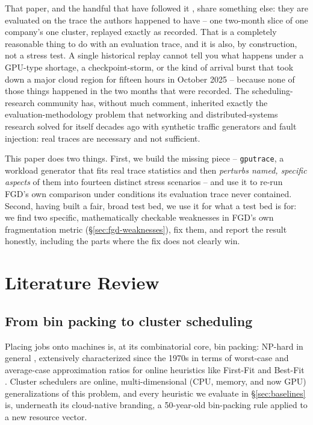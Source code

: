 \documentclass[11pt]{article}
\begin{document}
That paper, and the handful that have followed it
\citep{pwr2024}, share something else: they are evaluated on the trace the
authors happened to have -- one two-month slice of one company's one
cluster, replayed exactly as recorded. That is a completely reasonable
thing to do with an evaluation trace, and it is also, by construction, not
a stress test. A single historical replay cannot tell you what happens
under a GPU-type shortage, a checkpoint-storm, or the kind of arrival
burst that took down a major cloud region for fifteen hours in October
2025 \citep{awsoutage2025} -- because none of those things happened in the
two months that were recorded. The scheduling-research community has,
without much comment, inherited exactly the evaluation-methodology problem
that networking and distributed-systems research solved for itself
decades ago with synthetic traffic generators and fault injection: real
traces are necessary and not sufficient.

This paper does two things. First, we build the missing piece --
\texttt{gputrace}, a workload generator that fits real trace statistics
and then \emph{perturbs named, specific aspects} of them into fourteen
distinct stress scenarios -- and use it to re-run FGD's own comparison
under conditions its evaluation trace never contained. Second, having
built a fair, broad test bed, we use it for what a test bed is for:
we find two specific, mathematically checkable weaknesses in FGD's
own fragmentation metric (\S\ref{sec:fgd-weaknesses}), fix them, and
report the result honestly, including the parts where the fix does not
clearly win.

\section{Literature Review}

\subsection{From bin packing to cluster scheduling}
Placing jobs onto machines is, at its combinatorial core, bin packing:
NP-hard in general \citep{garey1979}, extensively characterized since the
1970s in terms of worst-case and average-case approximation ratios for
online heuristics like First-Fit and Best-Fit
\citep{johnson1974,coffman1984}. Cluster schedulers are online,
multi-dimensional (CPU, memory, and now GPU) generalizations of this
problem, and every heuristic we evaluate in \S\ref{sec:baselines} is,
underneath its cloud-native branding, a 50-year-old bin-packing rule
applied to a new resource vector.
\end{document}
